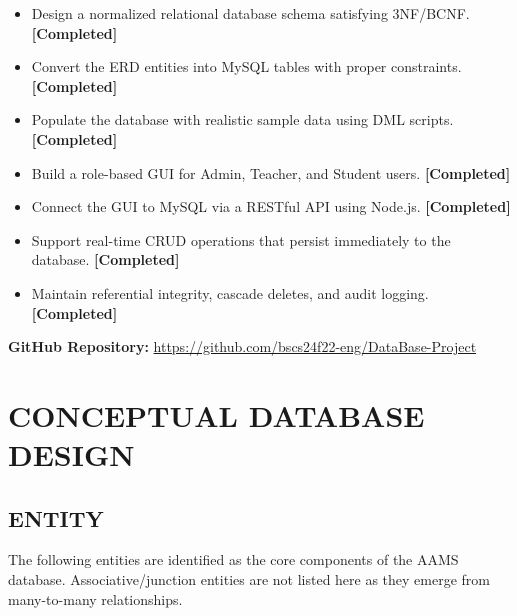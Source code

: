\documentclass[12pt,a4paper]{report}
\begin{document}
\begin{itemize}[noitemsep]
    \item Design a normalized relational database schema satisfying 3NF/BCNF. \hfill \textbf{[Completed]}
    \item Convert the ERD entities into MySQL tables with proper constraints. \hfill \textbf{[Completed]}
    \item Populate the database with realistic sample data using DML scripts. \hfill \textbf{[Completed]}
    \item Build a role-based GUI for Admin, Teacher, and Student users. \hfill \textbf{[Completed]}
    \item Connect the GUI to MySQL via a RESTful API using Node.js. \hfill \textbf{[Completed]}
    \item Support real-time CRUD operations that persist immediately to the database. \hfill \textbf{[Completed]}
    \item Maintain referential integrity, cascade deletes, and audit logging. \hfill \textbf{[Completed]}
\end{itemize}

\textbf{GitHub Repository:} \href{https://github.com/bscs24f22-eng/DataBase-Project}{https://github.com/bscs24f22-eng/DataBase-Project}

\chapter{CONCEPTUAL DATABASE DESIGN}

\section{ENTITY}

The following entities are identified as the core components of the AAMS database. Associative/junction entities are not listed here as they emerge from many-to-many relationships.
\end{document}
